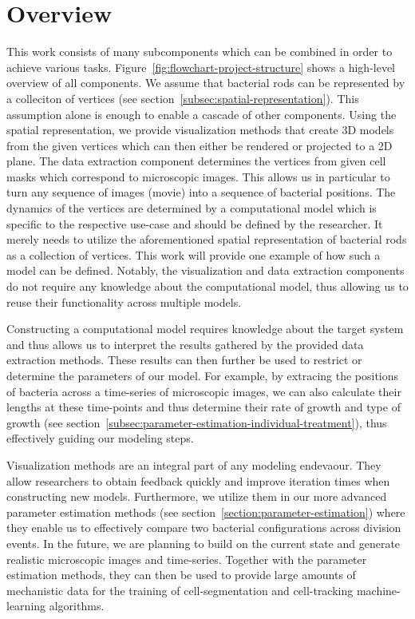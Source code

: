 \documentclass{article}
\begin{document}
\section{Overview}
This work consists of many subcomponents which can be combined in order to achieve various tasks.
Figure~\ref{fig:flowchart-project-structure} shows a high-level overview of all components.
We assume that bacterial rods can be represented by a colleciton of vertices (see
section~\ref{subsec:spatial-representation}).
This assumption alone is enough to enable a cascade of other components.
Using the spatial representation, we provide visualization methods that create 3D models from the
given vertices which can then either be rendered or projected to a 2D plane.
The data extraction component determines the vertices from given cell masks which
correspond to microscopic images.
This allows us in particular to turn any sequence of images (movie) into a sequence of bacterial
positions.
The dynamics of the vertices are determined by a computational model which is specific
to the respective use-case and should be defined by the researcher.
It merely needs to utilize the aforementioned spatial representation of bacterial rods as a
collection of vertices.
This work will provide one example of how such a model can be defined.
Notably, the visualization and data extraction components do not require any knowledge about the
computational model, thus allowing us to reuse their functionality across multiple models.

Constructing a computational model requires knowledge about the target system and thus allows us to
interpret the results gathered by the provided data extraction methods.
These results can then further be used to restrict or determine the parameters of our model.
For example, by extracing the positions of bacteria across a time-series of microscopic images, we
can also calculate their lengths at these time-points and thus determine their rate of growth and
type of growth (see section~\ref{subsec:parameter-estimation-individual-treatment}), thus
effectively guiding our modeling steps.

Visualization methods are an integral part of any modeling endevaour.
They allow researchers to obtain feedback quickly and improve iteration times when constructing new
models. Furthermore, we utilize them in our more advanced parameter estimation methods (see
section~\ref{section:parameter-estimation}) where they enable us to effectively compare
two bacterial configurations across division events.
In the future, we are planning to build on the current state and generate realistic microscopic
images and time-series.
Together with the parameter estimation methods, they can then be used to provide large amounts of
mechanistic data for the training of cell-segmentation and cell-tracking machine-learning
algorithms.
\end{document}
